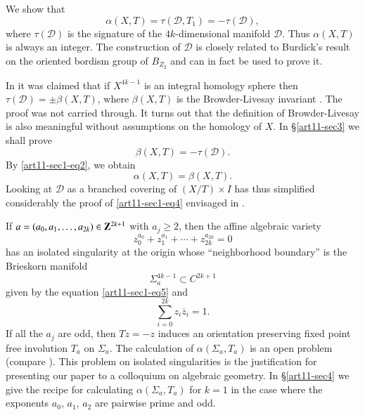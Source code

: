 We show that
$$
\alpha(X,T)=\tau(\mathscr{D},T_{1})=-\tau(\mathscr{D}),
$$\pageoriginale
where $\tau(\mathscr{D})$ is the signature of the $4k$-dimensional manifold $\mathscr{D}$. Thus $\alpha(X,T)$ is always an integer. The construction of $\mathscr{D}$ is closely related to Burdick's result on the oriented bordism group of $B_{Z_{2}}$ and can in fact be used to prove it.

In \cite{art11-key7} it was claimed that if $X^{4k-1}$ is an integral homology sphere then $\tau(\mathscr{D})=\pm \beta(X,T)$, where $\beta(X,T)$ is the Browder-Livesay invariant \cite{art11-key3}. The proof was not carried through. It turns out that the definition of Browder-Livesay is also meaningful without assumptions on the homology of $X$. In \S\ref{art11-sec3} we shall prove
\begin{equation*}
\beta(X,T)=-\tau(\mathscr{D}).\tag{3}\label{art11-sec1-eq3}
\end{equation*}
By \eqref{art11-sec1-eq2}, we obtain
\begin{equation*}
\alpha(X,T)=\beta(X,T).\tag{4}\label{art11-sec1-eq4}
\end{equation*}
Looking at $\mathscr{D}$ as a branched covering of $(X/T)\times I$ has thus simplified considerably the proof of \eqref{art11-sec1-eq4} envisaged in \cite{art11-key7}.

If $a=(a_{0},a_{1},\ldots,a_{2k})\in \mathbf{Z}^{2k+1}$ with $a_{j}\geq 2$, then the affine algebraic variety
\begin{equation*}
z^{a_{0}}_{0}+z^{a_{1}}_{1}+\cdots+z^{a_{2k}}_{2k}=0\tag{5}\label{art11-sec1-eq5}
\end{equation*}
has an isolated singularity at the origin whose ``neighborhood boundary'' is the Brieskorn manifold \cite{art11-key1}
$$
\Sigma^{4k-1}_{a}\subset C^{2k+1}
$$
given by the equation \eqref{art11-sec1-eq5} and 
\begin{equation*}
\sum\limits^{2k}_{i=0}z_{i}\overline{z}_{i}=1.\tag{6}\label{art11-sec1-eq6}
\end{equation*}
If all the $a_{j}$ are odd, then $Tz=-z$ induces an orientation preserving fixed point free involution $T_{a}$ on $\Sigma_{a}$. The calculation of $\alpha(\Sigma_{a},T_{a})$ is an open problem (compare \cite{art11-key7}). This problem on isolated singularities is the justification for presenting our paper to a colloquium on algebraic geometry. In \S\ref{art11-sec4} we give the recipe for calculating $\alpha(\Sigma_{a},T_{a})$ for $k=1$ in the case where the exponents $a_{0}$, $a_{1}$, $a_{2}$ are pairwise prime and odd.

